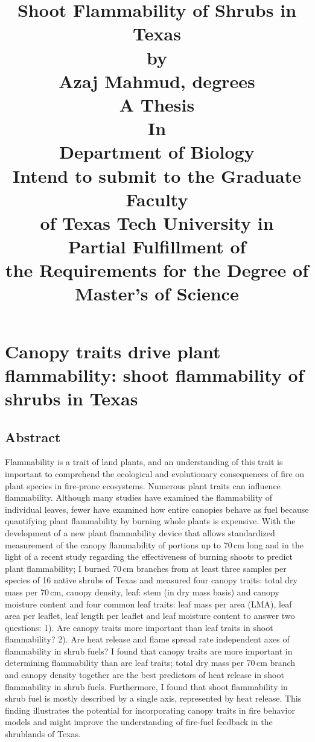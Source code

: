 \documentclass[12pt]{report}
\title{
  Shoot Flammability of Shrubs in Texas\\[15pt]
by\\
Azaj Mahmud, degrees\\
A Thesis\\
In\\
Department of Biology\\
Intend to submit to the Graduate Faculty\\
of Texas Tech University in\\
Partial Fulfillment of\\
the Requirements for the Degree of\\
Master's of Science\\}
\begin{document}
\maketitle
\tableofcontents
\listoftables
\listoffigures
\doublespacing

\chapter{Canopy traits drive plant flammability: shoot flammability of shrubs in Texas}

\section{Abstract}
    
Flammability is a trait of land plants, and an understanding of this trait is important to comprehend the ecological and evolutionary consequences of fire on plant species in fire-prone ecosystems. Numerous plant traits can influence flammability. Although many studies have examined the flammability of individual leaves, fewer have examined how entire canopies behave as fuel because quantifying plant flammability by burning whole plants is expensive. With the development of a new plant flammability device that allows standardized measurement of the canopy flammability of portions up to 70\,cm long and in the light of a recent study regarding the effectiveness of burning shoots to predict plant flammability; I burned 70\,cm branches from at least three samples per species of 16 native shrubs of Texas and measured four canopy traits: total dry mass per 70\,cm, canopy density, leaf: stem (in dry mass basis) and canopy moisture content and four common leaf traits: leaf mass per area (LMA), leaf area per leaflet, leaf length per leaflet and leaf moisture content to answer two questions: 1). Are canopy traits more important than leaf traits in shoot flammability? 2). Are heat release and flame spread rate independent axes of flammability in shrub fuels? I found that canopy traits are more important in determining flammability than are leaf traits; total dry mass per 70\,cm branch and canopy density together are the best predictors of heat release in shoot flammability in shrub fuels. Furthermore, I found that shoot flammability in shrub fuel is mostly described by a single axis, represented by heat release. This finding illustrates the potential for incorporating canopy traits in fire behavior models and might improve the understanding of fire-fuel feedback in the shrublands of Texas.
\end{document}
